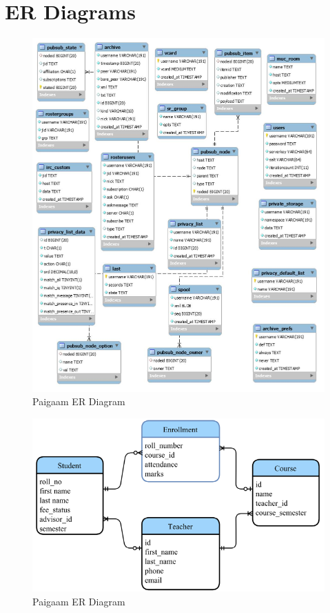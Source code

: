 \section{ER Diagrams}
\begin{figure}[ht]
\centering
\includegraphics[scale=0.35]{input/images/er1.png}
\caption{Paigaam ER Diagram}
\end{figure}
\newpage
\begin{figure}[ht]
\centering
\includegraphics[scale=0.3]{input/images/erp.png}
\caption{Paigaam ER Diagram}
\end{figure}
